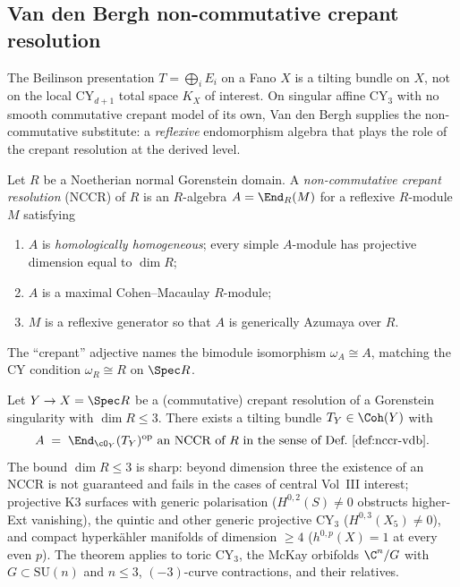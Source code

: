 \providecommand{\Mu}{\mathrm{M}}

\subsection{Van den Bergh non-commutative crepant resolution}
\label{subsec:vdb-nccr}

The Beilinson presentation $T = \bigoplus_i E_i$ on a Fano $X$ is a tilting bundle on $X$, not on the local CY$_{d+1}$ total space $K_X$ of interest. On singular affine CY$_3$ with no smooth commutative crepant model of its own, Van den Bergh supplies the non-commutative substitute: a \emph{reflexive} endomorphism algebra that plays the role of the crepant resolution at the derived level.

\begin{definition}
\label{def:nccr-vdb}
Let $R$ be a Noetherian normal Gorenstein domain. A \emph{non-commutative crepant resolution} (NCCR) of $R$ is an $R$-algebra $A = \End_R(M)$ for a reflexive $R$-module $M$ satisfying
\begin{enumerate}
 \item[(N1)] $A$ is \emph{homologically homogeneous}; every simple $A$-module has projective dimension equal to $\dim R$;
 \item[(N2)] $A$ is a maximal Cohen--Macaulay $R$-module;
 \item[(N3)] $M$ is a reflexive generator so that $A$ is generically Azumaya over $R$.
\end{enumerate}
The ``crepant'' adjective names the bimodule isomorphism $\omega_A \cong A$, matching the CY condition $\omega_R \cong R$ on $\Spec R$.
\end{definition}

\begin{theorem}
\label{thm:vdb-equivalence}
Let $Y \to X = \Spec R$ be a (commutative) crepant resolution of a Gorenstein singularity with $\dim R \leq 3$. There exists a tilting bundle $T_Y \in \Coh(Y)$ with
\[
 A \;=\; \End_{\cO_Y}(T_Y)^{\mathrm{op}} \text{ an NCCR of } R \text{ in the sense of Def.~\ref{def:nccr-vdb}}.
\]
The bound $\dim R \leq 3$ is sharp: beyond dimension three the existence of an NCCR is not guaranteed and fails in the cases of central Vol~III interest; projective K3 surfaces with generic polarisation ($H^{0,2}(S) \neq 0$ obstructs higher-Ext vanishing), the quintic and other generic projective CY$_3$ ($H^{0,3}(X_5) \neq 0$), and compact hyperk\"ahler manifolds of dimension $\geq 4$ ($h^{0,p}(X) = 1$ at every even $p$). The theorem applies to toric CY$_3$, the McKay orbifolds $\C^n/G$ with $G \subset \mathrm{SU}(n)$ and $n \leq 3$, $(-3)$-curve contractions, and their relatives.
\end{theorem}

